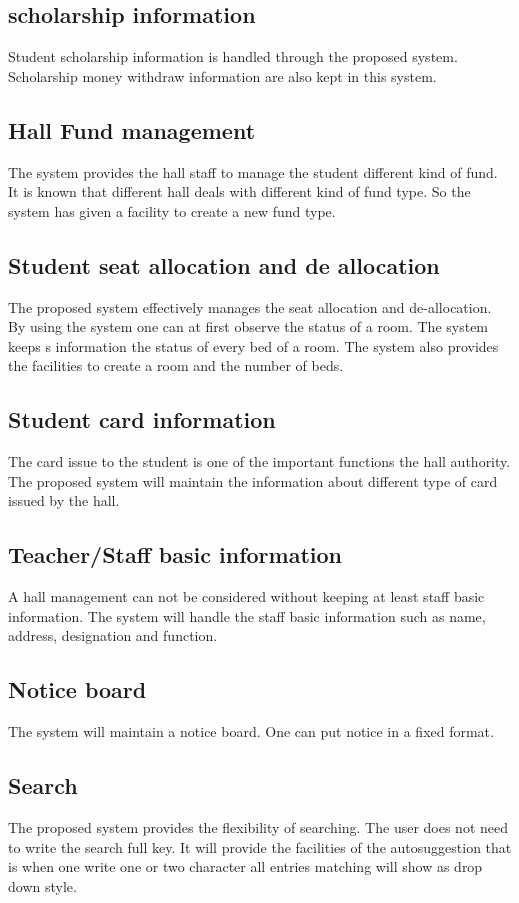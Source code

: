 \subsection{scholarship information} Student scholarship information
is handled through the proposed system. Scholarship money withdraw
information are also kept in this system.

\subsection{Hall Fund management}
 The system provides the hall staff
to manage the student different kind of fund.  It is known that
different hall deals with different kind of fund type. So the
system has given a facility to create a new fund type.

\subsection{Student seat allocation and de allocation}
 The proposed
system effectively manages the seat allocation and de-allocation.
By using the system one can at first observe the status of a room.
The system keeps s information the status of every bed of a room.
The system also provides the facilities to create a room and the
number of beds.
\subsection{ Student card information} The card
issue to the student is one of the important functions the hall
authority. The proposed system will maintain the information about
different type of card issued by the hall.


\subsection{Teacher/Staff basic information}
 A hall management can
not be considered without keeping at least staff basic
information. The system will handle the staff basic information
such as name, address, designation and function.
\subsection{Notice board} The system will maintain a notice board. One can put
notice in a fixed format.

\subsection{Search} The proposed system provides the flexibility of
searching. The user does not need to write the search full key. It
will provide the facilities of the autosuggestion that is when one
write one or two character all entries matching will show as drop
down style.


